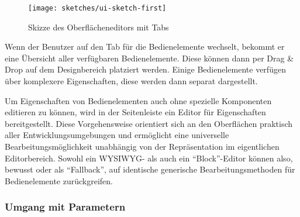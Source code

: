 \begin{figure}[h]
  \texttt{[image: sketches/ui-sketch-first]}
  \caption{Skizze des Oberflächeneditors mit Tabs}
  \label{fig:ui-editor-sketch-first}
\end{figure}

Wenn der Benutzer auf den Tab für die Bedienelemente wechselt, bekommt er eine Übersicht aller verfügbaren Bedienelemente. Diese können dann per Drag \& Drop auf dem Designbereich platziert werden. Einige Bedienelemente verfügen über komplexere Eigenschaften, diese werden dann separat dargestellt.

Um Eigenschaften von Bedienelementen auch ohne spezielle Komponenten editieren zu können, wird in der Seitenleiste ein Editor für Eigenschaften bereitgestellt. Diese Vorgehensweise orientiert sich an den Oberflächen praktisch aller Entwicklungsumgebungen und ermöglicht eine universelle Bearbeitungsmöglichkeit unabhängig von der Repräsentation im eigentlichen Editorbereich. Sowohl ein WYSIWYG- als auch ein "`Block"'-Editor können also, bewusst oder als "`Fallback"', auf identische generische Bearbeitungsmethoden für Bedienelemente zurückgreifen.

\subsubsection{Umgang mit Parametern}


